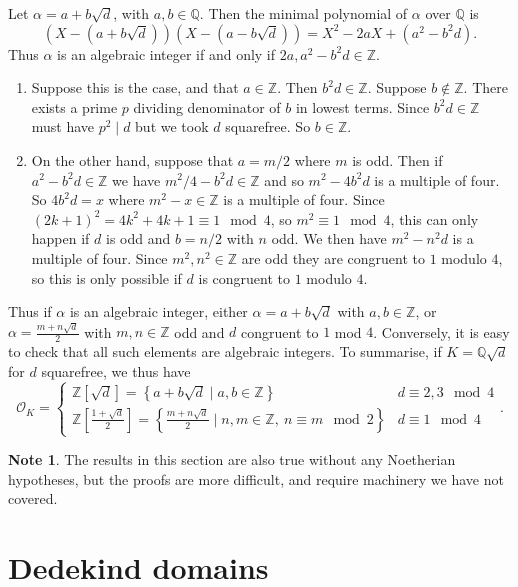 \documentclass{article}
\newcommand{\Z}{\mathbb{Z}}
\newcommand{\Q}{\mathbb{Q}}
\newcommand{\rb}[1]{\left( #1 \right)}
\renewcommand{\sb}[1]{\left[ #1 \right]}
\newcommand{\cb}[1]{\left\{ #1 \right\}}
\theoremstyle{definition}\newtheorem{definition}{Definition}[subsection]
\theoremstyle{definition}\newtheorem{remark}[definition]{Remark}
\theoremstyle{definition}\newtheorem*{example}{Example}
\theoremstyle{definition}\newtheorem*{note}{Note}
\begin{document}
Let $ \alpha = a + b\sqrt{d} $, with $ a, b \in \Q $. Then the minimal polynomial of $ \alpha $ over $ \Q $ is
$$ \rb{X - \rb{a + b\sqrt{d}}}\rb{X - \rb{a - b\sqrt{d}}} = X^2 - 2aX + \rb{a^2 - b^2d}. $$
Thus $ \alpha $ is an algebraic integer if and only if $ 2a, a^2 - b^2d \in \Z $.
\begin{enumerate}
\item Suppose this is the case, and that $ a \in \Z $. Then $ b^2d \in \Z $. Suppose $ b \notin \Z $. There exists a prime $ p $ dividing denominator of $ b $ in lowest terms. Since $ b^2d \in \Z $ must have $ p^2 \mid d $ but we took $ d $ squarefree. So $ b \in \Z $.
\item On the other hand, suppose that $ a = m / 2 $ where $ m $ is odd. Then if $ a^2 - b^2d \in \Z $ we have $ m^2 / 4 - b^2d \in \Z $ and so $ m^2 - 4b^2d $ is a multiple of four. So $ 4b^2d = x $ where $ m^2 - x \in \Z $ is a multiple of four. Since $ \rb{2k + 1}^2 = 4k^2 + 4k + 1 \equiv 1 \mod 4 $, so $ m^2 \equiv 1 \mod 4 $, this can only happen if $ d $ is odd and $ b = n / 2 $ with $ n $ odd. We then have $ m^2 - n^2d $ is a multiple of four. Since $ m^2, n^2 \in \Z $ are odd they are congruent to $ 1 $ modulo $ 4 $, so this is only possible if $ d $ is congruent to $ 1 $ modulo $ 4 $.
\end{enumerate}
Thus if $ \alpha $ is an algebraic integer, either $ \alpha = a + b\sqrt{d} $ with $ a, b \in \Z $, or $ \alpha = \tfrac{m + n\sqrt{d}}{2} $ with $ m, n \in \Z $ odd and $ d $ congruent to $ 1 $ mod $ 4 $. Conversely, it is easy to check that all such elements are algebraic integers. To summarise, if $ K = \Q\sqrt{d} $ for $ d $ squarefree, we thus have
$$ \mathcal{O}_K = \begin{cases} \Z\sb{\sqrt{d}} = \cb{a + b\sqrt{d} \mid a, b \in \Z} & d \equiv 2, 3 \mod 4 \\ \Z\sb{\tfrac{1 + \sqrt{d}}{2}} = \cb{\tfrac{m + n\sqrt{d}}{2} \mid n, m \in \Z, \ n \equiv m \mod 2} & d \equiv 1 \mod 4 \end{cases}. $$

\begin{note}
The results in this section are also true without any Noetherian hypotheses, but the proofs are more difficult, and require machinery we have not covered.
\end{note}


\section{Dedekind domains}
\end{document}
